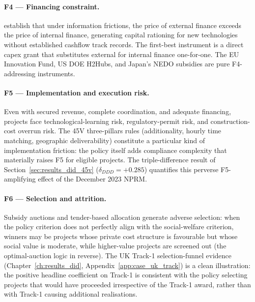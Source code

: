 \paragraph{F4 --- Financing constraint.} \cite{holmstrom1997financial} establish that under information frictions, the price of external finance exceeds the price of internal finance, generating capital rationing for new technologies without established cashflow track records. The first-best instrument is a direct capex grant that substitutes external for internal finance one-for-one. The EU Innovation Fund, US DOE H2Hubs, and Japan's NEDO subsidies are pure F4-addressing instruments.

\paragraph{F5 --- Implementation and execution risk.} Even with secured revenue, complete coordination, and adequate financing, projects face technological-learning risk, regulatory-permit risk, and construction-cost overrun risk. The 45V three-pillars rules (additionality, hourly time matching, geographic deliverability) constitute a particular kind of implementation friction: the policy itself adds compliance complexity that materially raises F5 for eligible projects. The triple-difference result of Section~\ref{sec:results_did_45v} ($\delta_{DDD} = +0.285$) quantifies this perverse F5-amplifying effect of the December 2023 NPRM.

\paragraph{F6 --- Selection and attrition.} Subsidy auctions and tender-based allocation generate adverse selection: when the policy criterion does not perfectly align with the social-welfare criterion, winners may be projects whose private cost structure is favourable but whose social value is moderate, while higher-value projects are screened out (the \cite{myerson1981optimal} optimal-auction logic in reverse). The UK Track-1 selection-funnel evidence (Chapter~\ref{ch:results_did}, Appendix~\ref{app:case_uk_track}) is a clean illustration: the positive headline coefficient on Track-1 is consistent with the policy selecting projects that would have proceeded irrespective of the Track-1 award, rather than with Track-1 causing additional realisations.

